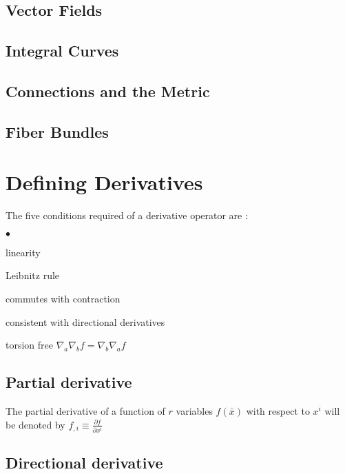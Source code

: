 \documentclass[twocolumn]{article}
\newcounter{bean}
\begin{document}
\subsection{Vector Fields}\label{SS:vec_fields}

\subsection{Integral Curves}\label{SS:int_curves}

\subsection{Connections and the Metric}\label{SS:conx_g}

\subsection{Fiber Bundles}\label{SS:fib_bun}


\section{Defining Derivatives}\label{S:def_deriv}

The five conditions required of a derivative operator are \cite{wald}:

\begin{list}
   {$\bullet$}{
    \setlength{\rightmargin}{\leftmargin}}
	\item linearity
 	\item Leibnitz rule
	\item commutes with contraction
	\item consistent with directional derivatives
	\item torsion free $\nabla_a \nabla_b f = \nabla_b \nabla_a f$
\end{list}


\subsection{Partial derivative}\label{SS:par_dervi}
The partial derivative of a function of $r$ variables $f(\bar x)$
with respect to $x^i$ will be denoted by $f_{,i} \equiv 
\frac{\partial f}{\partial x^i}$

\subsection{Directional derivative}\label{SS:dir_deriv}
\end{document}
